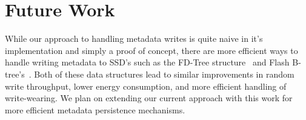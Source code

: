 \section{Future Work}
\label{sec:future}

While our approach to handling metadata writes is quite naive in it's
implementation and simply a proof of concept, there are more efficient
ways to handle writing metadata to SSD's such as the FD-Tree
structure~\cite{FD-Tree} and Flash B-tree's~\cite{FlashB-Tree}. Both
of these data structures lead to similar improvements in random write
throughput, lower energy consumption, and more efficient handling of
write-wearing. We plan on extending our current approach with this
work for more efficient metadata persistence mechanisms.
